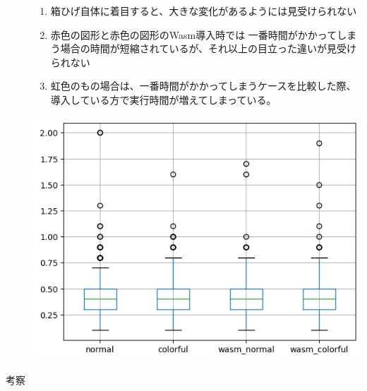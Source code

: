 \begin{description}
\begin{minipage}[t]{0.4\textwidth}
		\begin{enumerate}[parsep=-0.5\zh]
			\item 箱ひげ自体に着目すると、大きな変化があるようには見受けられない
			\item 赤色の図形と赤色の図形のWasm導入時では
			一番時間がかかってしまう場合の時間が短縮されているが、それ以上の目立った違いが見受けられない\\
			\item 虹色のもの場合は、一番時間がかかってしまうケースを比較した際、導入している方で実行時間が増えてしまっている。
		\end{enumerate}
	\end{minipage}
	\begin{minipage}[t]{0.6\textwidth}\vspace{0pt}
		\begin{center}
			\includegraphics[keepaspectratio, width=.9\linewidth,trim={0mm 0mm 0mm 0mm},clip]{box_chart.png}
		\end{center}
	\end{minipage}
	\newpage
	\item[考察]~\\
	\begin{description}

\end{description}
\end{description}
